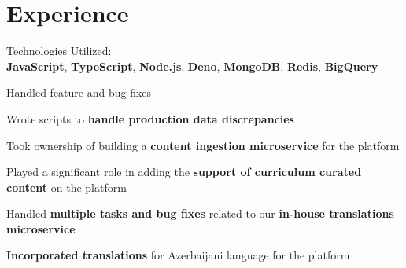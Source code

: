 \documentclass[]{deedy-resume-openfont}
\begin{document}
\begin{minipage}[t]{0.33\textwidth}

%
%

\end{minipage} 
\hfill
\begin{minipage}[t]{0.66\textwidth} 


\section{Experience}
\sectionsep

\sectionsep

\sectionsep
\begin{tightemize}
\item Technologies Utilized: \\\textbf{JavaScript}, \textbf{TypeScript}, \textbf{Node.js}, \textbf{Deno}, \textbf{MongoDB}, \textbf{Redis}, \textbf{BigQuery}
\item Handled feature and bug fixes
\item Wrote scripts to \textbf{handle production data discrepancies}
\item Took ownership of building a \textbf{content ingestion microservice} for the platform
\item Played a significant role in adding the \textbf{support of curriculum curated content} on the platform
\item Handled \textbf{multiple tasks and bug fixes} related to our \textbf{in-house translations microservice}
\item \textbf{Incorporated translations} for Azerbaijani language for the platform
\end{tightemize}
\sectionsep


\end{minipage}
\end{document}
